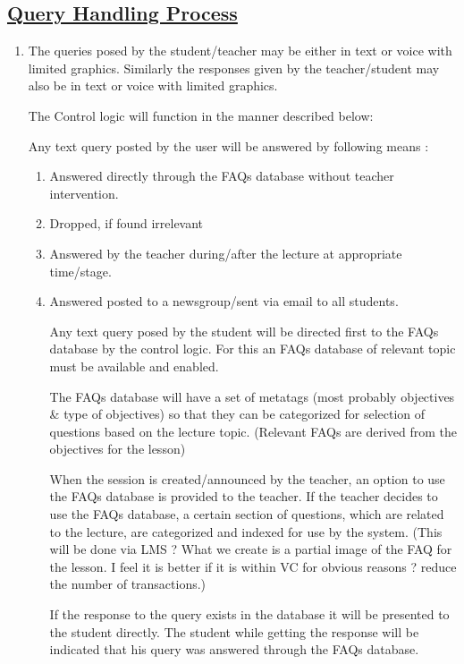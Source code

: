 \documentclass{article}
\begin{document}
\subsection*{\underline{Query Handling Process}}
\begin{enumerate}
\item[{}{}]

The queries posed by the student/teacher may be either in text or voice with limited graphics. Similarly the responses given by the teacher/student may also be in text or voice with limited graphics.

The Control logic will function in the manner described below:
 
Any text query posted by the user will be answered by following means : 


\begin{enumerate}

       \item Answered directly through the FAQs database without teacher intervention. 

        \item Dropped, if found irrelevant 
        
         \item Answered by the teacher during/after the lecture at appropriate time/stage. 

         \item Answered posted to a newsgroup/sent via email to all students. 

Any text query posed by the student will be directed first to the FAQs database by the control logic. For this an FAQs database of relevant topic must be available and enabled. 
 
The FAQs database will have a set of metatags (most probably objectives \& type of objectives) so that they can be categorized for selection of questions based on the lecture topic. (Relevant FAQs are derived from the objectives for the lesson) 
 
When the session is created/announced by the teacher, an option to use the FAQs database is provided to the teacher. If the teacher decides to use the FAQs database, a certain section of questions, which are related to the lecture, are categorized and indexed for use by the system. (This will be done via LMS ?  What we create is a partial image of the FAQ for the lesson. I feel it is better if it is within VC for obvious reasons ? reduce the number of transactions.) 
 
If the response to the query exists in the database it will be presented to the student directly. The student while getting the response will be indicated that his query was answered through the FAQs database. 
 

\end{enumerate}
\end{enumerate}
\end{document}
